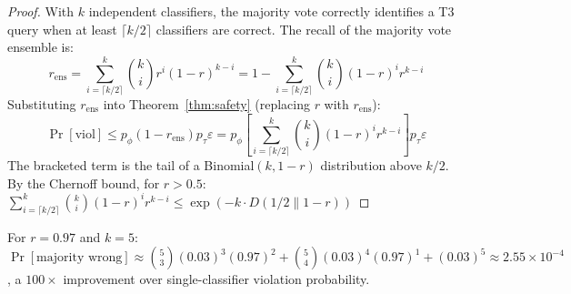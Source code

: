 \begin{proof}
With $k$ independent classifiers, the majority vote correctly 
identifies a T3 query when at least $\lceil k/2 \rceil$ classifiers 
are correct. The recall of the majority vote ensemble is:
\begin{equation}
r_{\text{ens}} = \sum_{i=\lceil k/2 \rceil}^{k} \binom{k}{i} r^i (1-r)^{k-i}
= 1 - \sum_{i=\lceil k/2\rceil}^{k}\binom{k}{i}(1-r)^i r^{k-i}
\end{equation}
Substituting $r_{\text{ens}}$ into Theorem~\ref{thm:safety} 
(replacing $r$ with $r_{\text{ens}}$):
\begin{equation}
\Pr[\text{viol}] \leq p_\phi(1-r_{\text{ens}})p_\tau\varepsilon
= p_\phi \left[\sum_{i=\lceil k/2\rceil}^{k}\binom{k}{i}(1-r)^i r^{k-i}\right] p_\tau \varepsilon
\end{equation}
The bracketed term is the tail of a Binomial$(k, 1-r)$ distribution 
above $k/2$. By the Chernoff bound, for $r > 0.5$:
$\sum_{i=\lceil k/2\rceil}^{k}\binom{k}{i}(1-r)^i r^{k-i} 
\leq \exp(-k \cdot D(1/2 \| 1-r))$
\end{proof}

\begin{remark}
For $r = 0.97$ and $k = 5$: $\Pr[\text{majority wrong}] \approx 
\binom{5}{3}(0.03)^3(0.97)^2 + \binom{5}{4}(0.03)^4(0.97)^1 + 
(0.03)^5 \approx 2.55 \times 10^{-4}$, a $100\times$ improvement 
over single-classifier violation probability.
\end{remark}
